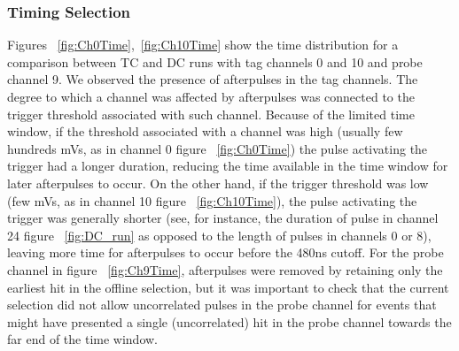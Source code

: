 \documentclass[12pt]{article}
\begin{document}
\subsubsection{Timing Selection} \label{tSelection}


Figures ~\ref{fig:Ch0Time},~\ref{fig:Ch10Time} show the time distribution for a comparison between TC and DC runs with tag channels 0 and 10 and probe channel 9. We observed the presence of afterpulses in the tag channels. The degree to which a channel was affected by afterpulses was connected to the trigger threshold associated with such channel. Because of the limited time window, if the threshold associated with a channel was high (usually few hundreds mVs, as in channel 0 figure ~\ref{fig:Ch0Time}) the pulse activating the trigger had a longer duration, reducing the time available in the time window for later afterpulses to occur. On the other hand, if the trigger threshold was low (few mVs, as in channel 10 figure ~\ref{fig:Ch10Time}), the pulse activating the trigger was generally shorter (see, for instance, the duration of pulse in channel 24 figure ~\ref{fig:DC_run} as opposed to the length of pulses in channels 0 or 8), leaving more time for afterpulses to occur before the 480ns cutoff. 
For the probe channel in figure ~\ref{fig:Ch9Time}, afterpulses were removed by retaining only the earliest hit in the offline selection, but it was important to check that the current selection did not allow uncorrelated pulses in the probe channel for events that might have presented a single (uncorrelated) hit in the probe channel towards the far end of the time window. 
\end{document}
